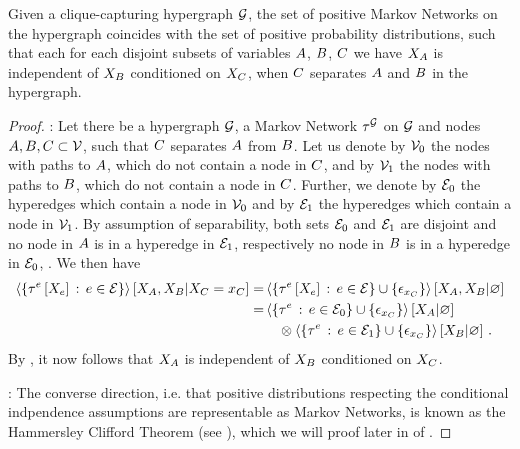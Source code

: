 \begin{theorem}
    \label{the:condIndMN}
    Given a clique-capturing hypergraph $\mathcal{G}$, the set of positive Markov Networks on the hypergraph coincides with the set of positive probability distributions, such that each for each disjoint subsets of variables $A$, $B$, $C$ we have $X_{A}$ is independent of $X_{B}$ conditioned on $X_{C}$, when $C$ separates $A$ and $B$ in the hypergraph. %
\end{theorem}
\begin{proof}
    \proofrightsymbol:
    Let there be a hypergraph $\mathcal{G}$, a Markov Network $\tau^{\mathcal{G}}$ on $\mathcal{G}$ and nodes $A,B,C \subset \mathcal{V}$, such that $C$ separates $A$ from $B$.
    Let us denote by $\mathcal{V}_0$ the nodes with paths to $A$, which do not contain a node in $C$, and by $\mathcal{V}_1$ the nodes with paths to $B$, which do not contain a node in $C$.
    Further, we denote by $\mathcal{E}_0$ the hyperedges which contain a node in $\mathcal{V}_0$ and by $\mathcal{E}_1$ the hyperedges which contain a node in $\mathcal{V}_1$.
    By assumption of separability, both sets $\mathcal{E}_0$ and $\mathcal{E}_1$ are disjoint and no node in $A$ is in a hyperedge in $\mathcal{E}_1$, respectively no node in $B$ is in a hyperedge in $\mathcal{E}_0$, .
    We then have
    \begin{align*}
        \left\langle \left\{\tau^{e}\left[X_{e}\right]\, : \, e\in\mathcal{E}\right\}\right\rangle \left[ X_{A},X_{B} | X_{C}=x_{C} \right]
        = & \left\langle \left\{\tau^{e}\left[X_{e}\right]\, : \, e\in\mathcal{E}\right\}\cup\{\epsilon_{x_{C}}\}\right\rangle \left[ X_{A},X_{B} | \varnothing \right] \\
        = &  \left\langle \{\tau^{e}\, : \, e\in\mathcal{E}_0\}\cup\{\epsilon_{x_{C}}\}\right\rangle \left[ X_{A} | \varnothing \right] \\
        & \quad \otimes \left\langle \{\tau^{e}\, : \, e\in\mathcal{E}_1\}\cup\{\epsilon_{x_{C}}\}\right\rangle \left[ X_{B} | \varnothing \right] \, .
    \end{align*}
    By , it now follows that $X_{A}$ is independent of $X_{B}$ conditioned on $X_{C}$.

    \proofleftsymbol:
    The converse direction, i.e. that positive distributions respecting the conditional indpendence assumptions are representable as Markov Networks, is known as the Hammersley Clifford Theorem (see \cite{clifford_markov_1971}), which we will proof later in  of .
\end{proof}

